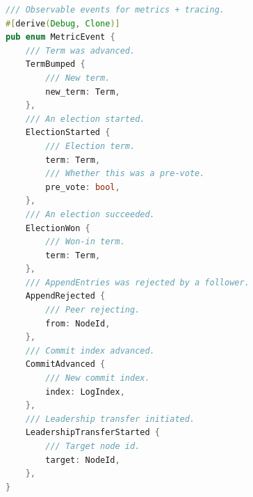 \documentclass[12pt,a4paper]{report}
\begin{document}
\begin{lstlisting}[language=Rust]
/// Observable events for metrics + tracing.
#[derive(Debug, Clone)]
pub enum MetricEvent {
    /// Term was advanced.
    TermBumped {
        /// New term.
        new_term: Term,
    },
    /// An election started.
    ElectionStarted {
        /// Election term.
        term: Term,
        /// Whether this was a pre-vote.
        pre_vote: bool,
    },
    /// An election succeeded.
    ElectionWon {
        /// Won-in term.
        term: Term,
    },
    /// AppendEntries was rejected by a follower.
    AppendRejected {
        /// Peer rejecting.
        from: NodeId,
    },
    /// Commit index advanced.
    CommitAdvanced {
        /// New commit index.
        index: LogIndex,
    },
    /// Leadership transfer initiated.
    LeadershipTransferStarted {
        /// Target node id.
        target: NodeId,
    },
}
\end{lstlisting}
\end{document}
